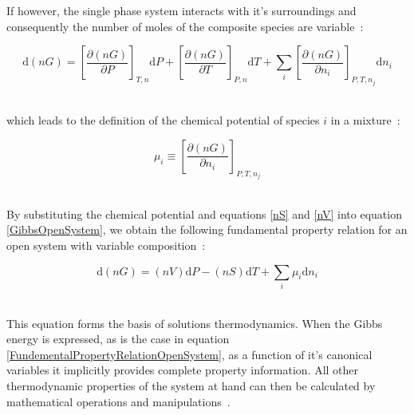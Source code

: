 If however, the single phase system interacts with it's surroundings and consequently the number of moles of the composite species are variable~\cite{SmithNessAbbott}:\

\begin{equation}
\mathrm{d}\left(nG\right) = \left[\frac{\partial \left(nG\right)}{\partial P}\right]_{T, n}\mathrm{d}P + \left[\frac{\partial \left(nG\right)}{\partial T}\right]_{P, n}\mathrm{d}T + \sum_{i}\left[\frac{\partial \left(nG\right)}{\partial n_{i}}\right]_{P, T, n_{j}}\mathrm{d} n_{i} \label{GibbsOpenSystem}
\end{equation}\

which leads to the definition of the chemical potential of species $i$ in a mixture~\cite{SmithNessAbbott, MolecularThermodynamicsOfFluidPhaseEquilibria}:\

\begin{equation}
\mu_{i} \equiv \left[\frac{\partial \left(nG\right)}{\partial n_{i}}\right]_{P, T, n_{j}} \label{ChemicalPotential}
\end{equation}\


By substituting the chemical potential and equations \ref{nS} and \ref{nV} into equation \ref{GibbsOpenSystem}, we obtain the following fundamental property relation for an open system with variable composition~\cite{SmithNessAbbott}:\

\begin{equation}
\mathrm{d}\left(nG\right) = \left(nV\right)\mathrm{d}P - \left(nS\right)\mathrm{d}T + \sum_{i}\mu_{i}\mathrm{d} n_{i} \label{FundementalPropertyRelationOpenSystem}
\end{equation}\

This equation forms the basis of solutions thermodynamics. When the Gibbs energy is expressed, as is the case in equation \ref{FundementalPropertyRelationOpenSystem}, as a function of it's canonical variables it implicitly provides complete property information. All other thermodynamic properties of the system at hand can then be calculated by mathematical operations and manipulations~\cite{SmithNessAbbott, MolecularThermodynamicsOfFluidPhaseEquilibria}.


